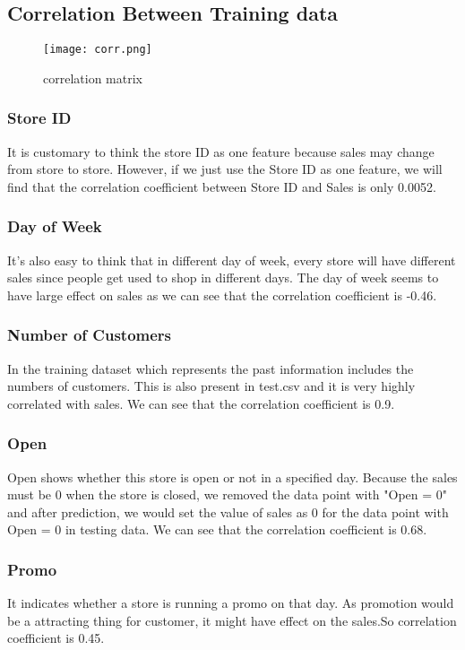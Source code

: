 \documentclass[letterpaper, 10 pt, conference]{ieeeconf}  %
\begin{document}
\subsection{Correlation Between Training data} 

\begin{figure}[h!]
  \centering
  \texttt{[image: corr.png]}
  \caption{correlation matrix}
\end{figure}


\subsubsection{\textbf{Store ID}}

It is customary to think the store ID as one feature because
sales may change from store to store. However, if we just use
the Store ID as one feature, we will find that the correlation coefficient between Store ID and Sales is only 0.0052.

\subsubsection{\textbf{Day of Week}}
It’s also easy to think that in different day of week, every
store will have different sales since people get used to shop
in different days. The day of week seems to have large effect
on sales as we can see that the correlation coefficient is -0.46.

\subsubsection{\textbf{Number of Customers}}
In the training dataset which represents the past information includes the numbers of customers. This is also present in test.csv and it is very highly correlated with sales. We can see that the correlation coefficient is 0.9.

\subsubsection{\textbf{Open}}
Open shows whether this store is open or not in a specified day. Because  the  sales  must  be  0  when  the  store  is
closed, we removed the data point with "Open = 0" and after
prediction, we would set the value of sales as 0 for the data
point with Open = 0 in testing data. We can see that the correlation coefficient is 0.68.

\subsubsection{\textbf{Promo}}
It indicates whether a store is running a promo on that day.
As  promotion  would  be  a  attracting  thing  for customer, it might have effect on the sales.So correlation coefficient is 0.45.
\end{document}
